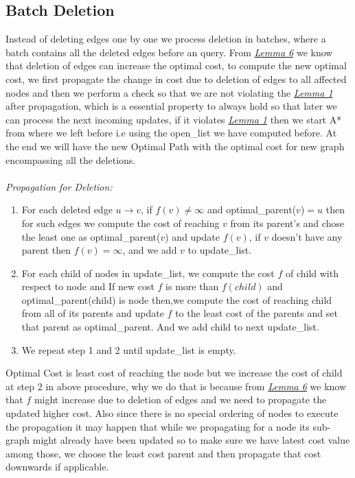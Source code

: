 \documentclass[a4paper]{article}
\begin{document}
\subsection{Batch Deletion}
Instead of deleting edges one by one we process deletion in batches, where a batch contains all the deleted edges before an query. From \hyperlink{Lemma 6}{\textit{Lemma 6}} we know that deletion of edges can increase the optimal cost, to compute the new optimal cost, we first propagate the change in cost due to deletion of edges to all affected nodes and then we perform a check so that we  are not violating the \hyperlink{Lemma 1}{\textit{Lemma 1}} after propagation, which is a essential property to always hold so that later we can process the next incoming updates, if it violates \hyperlink{Lemma 1}{\textit{Lemma 1}} then we start A* from where we left before i.e using the open\_list we have computed before. At the end we will have the new Optimal Path with the optimal cost for new graph encompassing all the deletions.\\
\\
\textit{Propagation for Deletion:}
\begin{enumerate}
    \item For each deleted edge $u \rightarrow v$, if $f(v) \neq \infty$ and optimal\_parent($v$)$=u$ then for such edges we compute the cost of reaching $v$ from its parent's and chose the least one as optimal\_parent($v$) and update $f(v)$, if $v$ doesn't have any parent then $f(v)=\infty$, and we add $v$ to update\_list.
    
    \item For each child of nodes in update\_list, we compute the cost $f$ of child with respect to node and If new cost $f$ is more than $f(child)$ and optimal\_parent(child)  is node then,we compute the cost of reaching child from all of its parents and update $f$ to the least cost of the parents and set that parent as optimal\_parent. And we add child to next update\_list.
    
    \item We repeat step 1 and 2 until update\_list is empty.
\end{enumerate}
Optimal Cost is least cost of reaching the node but we increase the cost of child at step 2 in above procedure, why we do that is because from \hyperlink{Lemma 6}{\textit{Lemma 6}} we know that $f$ might increase due to deletion of edges and we need to propagate the updated higher cost. Also since there is no special ordering of nodes to execute the propagation it may happen that while we propagating for a node its sub-graph might already have been updated so to make sure we have latest cost value among those, we choose the least cost parent and then propagate that cost downwards if applicable.\\ 
\end{document}

